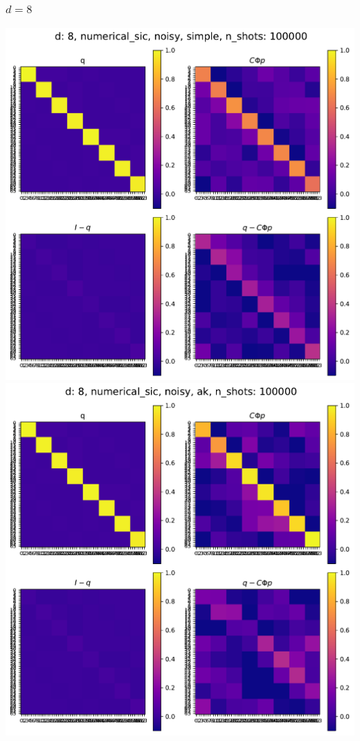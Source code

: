 \documentclass{beamer}
\begin{document}
\begin{frame}
\frametitle{$d=8$}
\begin{center}
\includegraphics[scale=0.25]{img/q_d8_numerical_sic_noisy_simple_n100000}\includegraphics[scale=0.25]{img/q_d8_numerical_sic_noisy_ak_n100000}		
\end{center}
\end{frame}
\end{document}
